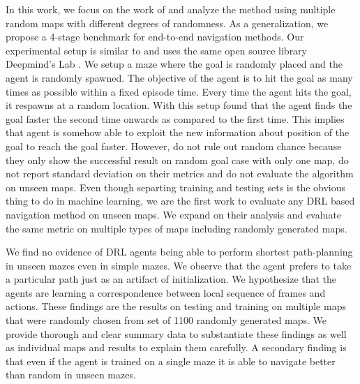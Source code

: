 In this work, we focus on the work of \cite{MiPaViICLR2017} and analyze the method using multiple random maps with different degrees of randomness. As a generalization, we propose a 4-stage benchmark for end-to-end navigation methods.
Our experimental setup is similar to \cite{MiPaViICLR2017} and uses the same open source library Deepmind's Lab \cite{BeLeTeARXIV2016}.
We setup a maze where the goal is randomly placed and the agent is randomly spawned.
The objective of the agent is to hit the goal as many times as possible within a fixed episode time.
Every time the agent hits the goal, it respawns at a random location.
With this setup \cite{MiPaViICLR2017} found that the agent finds the goal faster the second time onwards as compared to the first time.
This implies that agent is somehow able to exploit the new information about position of the goal to reach the goal faster.
However, \cite{MiPaViICLR2017} do not rule out random chance because they only show the successful result on random goal case with only one map, do not report standard deviation on their metrics and do not evaluate the algorithm on unseen maps.
Even though separting training and testing sets is the obvious thing to do in machine learning, we are the first work to evaluate any DRL based navigation method on unseen maps.
We expand on their analysis and evaluate the same metric on multiple types of maps including randomly generated maps.

We find no evidence of DRL agents being able to perform shortest path-planning in unseen mazes even in simple mazes.
We observe that the agent prefers to take a particular path just as an artifact of initialization.
We hypothesize that the agents are learning a correspondence between local sequence of frames and actions.
These findings are the results on testing and training on multiple maps that were randomly chosen from set of 1100 randomly generated maps.
We provide thorough and clear summary data to substantiate these findings as well as individual maps and results to explain them carefully.
A secondary finding is that even if the agent is trained on a single maze it is able to navigate better than random in unseen mazes.


